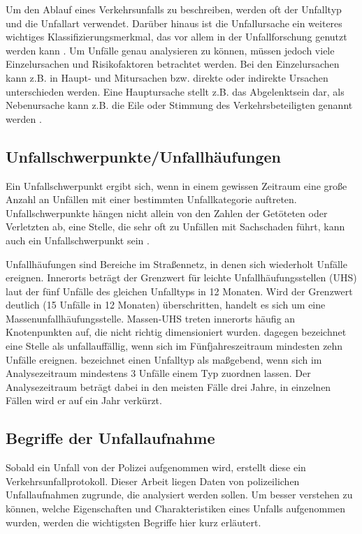 Um den Ablauf eines Verkehrsunfalls zu beschreiben, werden oft der Unfalltyp und die Unfallart verwendet. Darüber hinaus ist die Unfallursache ein weiteres wichtiges Klassifizierungsmerkmal, das vor allem in der Unfallforschung genutzt werden kann \parencite[S. 16]{Gschwendtner.2015}. Um Unfälle genau analysieren zu können, müssen jedoch viele Einzelursachen und Risikofaktoren betrachtet werden. Bei den Einzelursachen kann z.B. in Haupt- und Mitursachen bzw. direkte oder indirekte Ursachen unterschieden werden. Eine Hauptursache stellt z.B. das Abgelenktsein dar, als Nebenursache kann z.B. die Eile oder Stimmung des Verkehrsbeteiligten genannt werden \parencite[S. 65-72]{Grundl.2005}. 

\subsection{Unfallschwerpunkte/Unfallhäufungen}\label{subsection:Unfallschwerpunkte}
Ein Unfallschwerpunkt ergibt sich, wenn in einem gewissen Zeitraum eine große Anzahl an Unfällen mit einer bestimmten Unfallkategorie auftreten. Unfallschwerpunkte hängen nicht allein von den Zahlen der Getöteten oder Verletzten ab, eine Stelle, die sehr oft zu Unfällen mit Sachschaden führt, kann auch ein Unfallschwerpunkt sein \parencite[S. 145-151]{Huguenin.2017}.

Unfallhäufungen sind Bereiche im Straßennetz, in denen sich wiederholt Unfälle ereignen. Innerorts beträgt der Grenzwert für leichte Unfallhäufungsstellen (UHS) laut der \Textcite[S. 13-16]{ForschungsgesellschaftfurStraenundVerkehrswesen.2012} fünf Unfälle des gleichen Unfalltyps in 12 Monaten. Wird der Grenzwert deutlich (15 Unfälle in 12 Monaten) überschritten, handelt es sich um eine Massenunfallhäufungsstelle. Massen-UHS treten innerorts häufig an Knotenpunkten auf, die nicht richtig dimensioniert wurden. \Textcite[S. 221]{Schreiber.2014} dagegen bezeichnet eine Stelle als unfallauffällig, wenn sich im Fünfjahreszeitraum mindesten zehn Unfälle ereignen. \Textcite[S. 325]{Berger.2017} bezeichnet einen Unfalltyp als maßgebend, wenn sich im Analysezeitraum mindestens 3 Unfälle einem Typ zuordnen lassen. Der Analysezeitraum beträgt dabei in den meisten Fälle drei Jahre, in einzelnen Fällen wird er auf ein Jahr verkürzt.

\subsection{Begriffe der Unfallaufnahme}\label{subsection:Begriffe der Unfallaufnahme}
Sobald ein Unfall von der Polizei aufgenommen wird, erstellt diese ein Verkehrsunfallprotokoll. Dieser Arbeit liegen Daten von polizeilichen Unfallaufnahmen zugrunde, die analysiert werden sollen. Um besser verstehen zu können, welche Eigenschaften und Charakteristiken eines Unfalls aufgenommen wurden, werden die wichtigsten Begriffe hier kurz erläutert.

